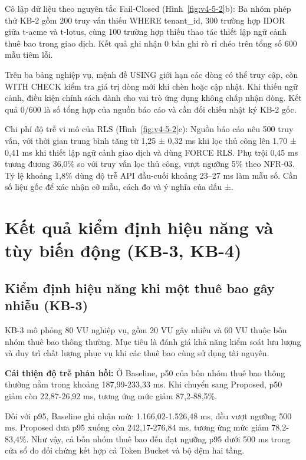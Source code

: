 Cô lập dữ liệu theo nguyên tắc Fail-Closed (Hình~\ref{fig:v4-5-2}b): Ba nhóm phép thử KB-2 gồm 200 truy vấn thiếu WHERE tenant\_\allowbreak{}id, 300 trường hợp IDOR giữa t-acme và t-lotus, cùng 100 trường hợp thiếu thao tác thiết lập ngữ cảnh thuê bao trong giao dịch. Kết quả ghi nhận 0 bản ghi rò rỉ chéo trên tổng số 600 mẫu tiêm lỗi.

Trên ba bảng nghiệp vụ, mệnh đề USING giới hạn các dòng có thể truy cập, còn WITH CHECK kiểm tra giá trị dòng mới khi chèn hoặc cập nhật. Khi thiếu ngữ cảnh, điều kiện chính sách dành cho vai trò ứng dụng không chấp nhận dòng. Kết quả 0/600 là số tổng hợp của nguồn báo cáo và cần đối chiếu nhật ký KB-2 gốc.

Chi phí độ trễ vi mô của RLS (Hình~\ref{fig:v4-5-2}c): Nguồn báo cáo nêu 500 truy vấn, với thời gian trung bình tăng từ 1,25 ± 0,32 ms khi lọc thủ công lên 1,70 ± 0,41 ms khi thiết lập ngữ cảnh giao dịch và dùng FORCE RLS. Phụ trội 0,45 ms tương đương 36,0\% so với truy vấn lọc thủ công, vượt ngưỡng 5\% theo NFR-03. Tỷ lệ khoảng 1,8\% dùng độ trễ API đầu-cuối khoảng 23--27 ms làm mẫu số. Cần số liệu gốc để xác nhận cỡ mẫu, cách đo và ý nghĩa của dấu ±.

\section{Kết quả kiểm định hiệu năng và tùy biến động (KB-3, KB-4)}\label{v4-sec-5-3}

\subsection{Kiểm định hiệu năng khi một thuê bao gây nhiễu (KB-3)}\label{v4-sec-5-3-1}

KB-3 mô phỏng 80 VU nghiệp vụ, gồm 20 VU gây nhiễu và 60 VU thuộc bốn nhóm thuê bao thông thường. Mục tiêu là đánh giá khả năng kiểm soát lưu lượng và duy trì chất lượng phục vụ khi các thuê bao cùng sử dụng tài nguyên.


\textbf{Cải thiện độ trễ phản hồi:} Ở Baseline, p50 của bốn nhóm thuê bao thông thường nằm trong khoảng 187,99-233,33 ms. Khi chuyển sang Proposed, p50 giảm còn 22,87-26,92 ms, tương ứng mức giảm 87,2-88,5\%.

Đối với p95, Baseline ghi nhận mức 1.166,02-1.526,48 ms, đều vượt ngưỡng 500 ms. Proposed đưa p95 xuống còn 242,17-276,84 ms, tương ứng mức giảm 78,2-83,4\%. Như vậy, cả bốn nhóm thuê bao đều đạt ngưỡng p95 dưới 500 ms trong cửa sổ đo đối chứng kết hợp cả Token Bucket và bộ đệm hai tầng.

